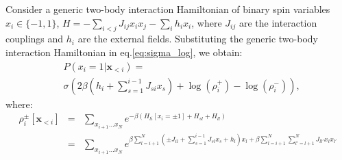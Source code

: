 \documentclass[aps,physrev,10pt,floatfix,longbibliography,nofootinbib,reprint]{revtex4-2}
\begin{document}
Consider a generic two-body interaction Hamiltonian of binary spin variables $x_i \in \{-1,1\}$, $H = -\sum_{i<j} J_{ij} x_i x_j - \sum_{i} h_i x_i$, where $J_{ij}$ are the interaction couplings and $h_i$ are the external fields. Substituting the generic two-body interaction Hamiltonian in eq.\ref{eq:sigma_log}, we obtain:
\begin{equation}
    \begin{split}
    & P\left(x_{i}=1|\mathbf{x}_{<i}\right) = \\
    & \sigma\left( 2 \beta \left(h_i + \sum_{s=1}^{i-1} J_{si} x_s\right) +\log(\rho_i^+) - \log(\rho_i^-)
    \right),   
    \end{split}
\label{eq:conditional_ghann}
\end{equation}
where:
\begin{eqnarray}
    \label{eq:rho_ghann}
\rho_i^{\pm}[\mathbf{x}_{<i}] &=& \sum_{x_{i+1}\dots x_{N}} e^{-\beta \left(
H_{li}[x_i = \pm 1] + H_{sl} + H_{ll}\right)} \\
& = & \sum_{x_{i+1}\dots x_{N}} e^{
\beta\sum_{l=i+1}^{N}\left( \pm J_{il} + \sum_{s=1}^{i-1} J_{sl} x_s + h_l \right) x_l + \beta\sum_{l=i+1}^{N}\sum_{l'=l+1}^{N} J_{ll'} x_l x_{l'} }
\end{eqnarray}
\end{document}
